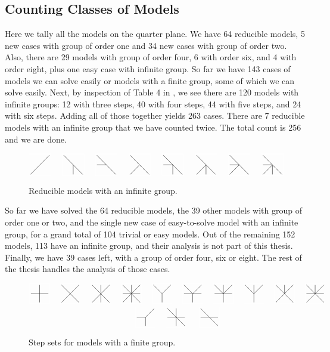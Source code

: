 \subsection{Counting Classes of Models}

Here we tally all the models on the quarter plane. We have 64 reducible models, 5 new cases with group of order one and 34 new cases with group of order two. Also, there are 29 models with group of order four, 6 with order six, and 4 with order eight, plus one easy case with infinite group. So far we have 143 cases of models we can solve easily or models with a finite group, some of which we can solve easily. Next, by inspection of Table 4 in \cite[p.~28]{bousquet2010walks}, we see there are 120 models with infinite groups: 12 with three steps, 40 with four steps, 44 with five steps, and 24 with six steps. Adding all of those together yields 263 cases. There are 7 reducible models with an infinite group that we have counted twice. The total count is 256 and we are done.
\begin{figure}[H]
	\centering
	\begin{align*}
		\modelgraph 00100100 \quad \modelgraph 10000011 \quad \modelgraph 10010001 \quad \modelgraph 10000101 \quad \modelgraph 10010011 \quad \modelgraph 10000111 \quad \modelgraph 10010101 \quad \modelgraph 10010111
	\end{align*}
	\caption{Reducible \classic \twoD models with an infinite group.}
\end{figure}

So far we have solved the 64 reducible models, the 39 other models with group of order one or two, and the single new case of easy-to-solve model with an infinite group, for a grand total of 104 trivial or easy models. Out of the remaining 152 models, 113 have an infinite group, and their analysis is not part of this thesis. Finally, we have 39 cases left, with a group of order four, six or eight. The rest of the thesis handles the analysis of those cases.

\begin{figure}[H]
	\centering
	\begin{align*}
		\modelgraph 01011010 \quad \modelgraph 10100101  \quad \modelgraph 11100111 \quad \modelgraph 11111111 \quad \modelgraph 10100010 \quad &\modelgraph 10111010 \quad \modelgraph 11111010 \quad \modelgraph 11100010  \quad \modelgraph 11100101  \quad \modelgraph 11111101\\
	 	\modelgraph 00110010 \quad \modelgraph 11011011 \!\exxxx&\, \quad\quad \modelgraph 10011001
	\end{align*}
	\caption{Step sets for \classic \twoD models with a finite group.}
\end{figure}

